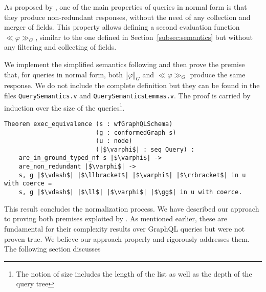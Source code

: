 As proposed by \HP{}, one of the main properties of queries in normal form is that they produce non-redundant responses, without the need of any collection and merger of fields. This property allows defining a second evaluation function $\ll \varphi \gg_{G}$, similar to the one defined in Section~\ref{subsec:semantics} but without any filtering and collecting of fields.

We implement the simplified semantics following \HP{} and then prove the premise that, for queries in normal form, both $\llbracket \varphi \rrbracket_{G}$ and $\ll \varphi \gg_{G}$ produce the same response. We do not include the complete definition but they can be found in the files \texttt{QuerySemantics.v} and \texttt{QuerySemanticsLemmas.v}. The proof is carried by induction over the size of the queries\footnote{The notion of size includes the length of the list as well as the depth of the query tree}.

\begin{verbatim}
Theorem exec_equivalence (s : wfGraphQLSchema)
                         (g : conformedGraph s)
                         (u : node)
                         (|$\varphi$| : seq Query) :
    are_in_ground_typed_nf s |$\varphi$| ->
    are_non_redundant |$\varphi$| ->
    s, g |$\vdash$| |$\llbracket$| |$\varphi$| |$\rrbracket$| in u with coerce =
    s, g |$\vdash$| |$\ll$| |$\varphi$| |$\gg$| in u with coerce.
\end{verbatim}

This result concludes the normalization process. We have described our approach to proving both premises exploited by \HP{}. As mentioned earlier, these are fundamental for their complexity results over GraphQL queries but were not proven true. We believe our approach properly and rigorously addresses them. The following section discusses
